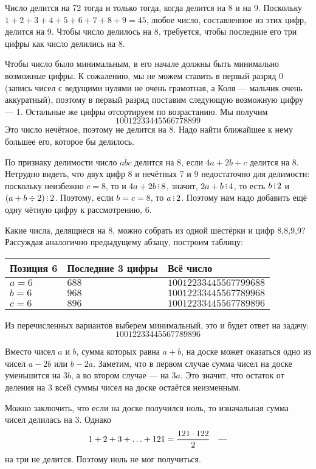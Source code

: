 \begin{itemize}
\itA Число делится на 72 тогда и только тогда, когда делится на 8 и на 9.
Поскольку $1+2+3+4+5+6+7+8+9 = 45$, любое число, составленное из этих цифр, делится на 9.
Чтобы число делилось на 8, требуется, чтобы последние его три цифры как число делились
на 8. 

Чтобы число было минимальным, в его начале должны быть минимально возможные цифры.
К сожалению, мы не можем ставить в первый разряд 0 (запись чисел с ведущими нулями не 
очень грамотная, а Коля --- мальчик очень аккуратный), поэтому в первый разряд поставим
следующую возможную цифру --- 1. Остальные же цифры отсортируем по возрастанию.
Мы получим $$10012233445566778899$$
Это число нечётное, поэтому не делится на 8.
Надо найти ближайшее к нему большее его, которое бы делилось.

По признаку
делимости число $\overline{abc}$ делится на 8, если $4a + 2b +c$ делится на 8.
Нетрудно видеть, что двух цифр 8 и нечётных 7 и 9 недостаточно для делимости:
поскольку неизбежно $c = 8$, то и $4a + 2b \divsby 8$, значит, $2a+b \divsby 4$, 
то есть $b \divsby 2$ и $(a + b \div 2) \divsby 2$. Поэтому, если $b = c = 8$,
то $a \divsby 2$. Поэтому нам надо добавить ещё одну чётную цифру к рассмотрению,
6.

Какие числа, делящиеся на 8, можно собрать из одной шестёрки и цифр 8,8,9,9? 
Рассуждая аналогично предыдущему абзацу, построим таблицу:

\begin{center}\begin{tabular}{lll}
Позиция 6 & Последние 3 цифры & Всё число\\
\hline
$a=6$ & $688$ & $10012233445567799688$\\
$b=6$ & $968$ & $10012233445567789968$\\
$c=6$ & $896$ & $10012233445567789896$
\end{tabular}\end{center}

Из перечисленных вариантов выберем минимальный, это и будет ответ на задачу:
$$10012233445567789896$$

\itB Вместо чисел $a$ и $b$, сумма которых равна $a+b$, на доске может оказаться
одно из чисел $a-2b$ или $b-2a$. Заметим, что в первом случае сумма чисел
на доске уменьшится на $3b$, а во втором случае — на $3a$. Это значит, что остаток
от деления на 3 всей суммы чисел на доске остаётся неизменным.

Можно заключить, что если на доске получился ноль, то изначальная сумма чисел делилась на 3. Однако
	$$1+2+3+\ldots+121 = \frac{121 \cdot 122}{2}\text{\quad —}$$
на три не делится. Поэтому ноль не мог получиться.


\end{itemize}
